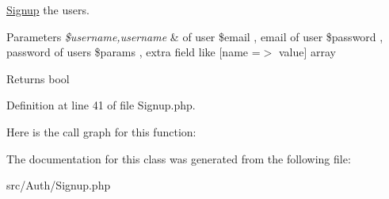 \mbox{\hyperlink{class_zest_1_1_auth_1_1_signup}{Signup}} the users.


\begin{DoxyParams}{Parameters}
{\em \$username,username} & of user \$email , email of user \$password , password of users \$params , extra field like \mbox{[}name =$>$ value\mbox{]} array\\
\hline
\end{DoxyParams}
\begin{DoxyReturn}{Returns}
bool 
\end{DoxyReturn}


Definition at line 41 of file Signup.\+php.

Here is the call graph for this function\+:


The documentation for this class was generated from the following file\+:\begin{DoxyCompactItemize}
\item 
src/\+Auth/Signup.\+php\end{DoxyCompactItemize}
